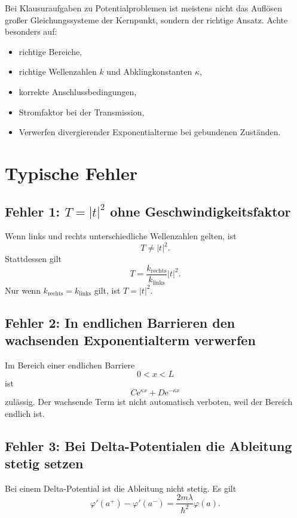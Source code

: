 \begin{examtipbox}
Bei Klausuraufgaben zu Potentialproblemen ist meistens nicht das Auflösen großer Gleichungssysteme der Kernpunkt, sondern der richtige Ansatz. Achte besonders auf:
\begin{itemize}
    \item richtige Bereiche,
    \item richtige Wellenzahlen $k$ und Abklingkonstanten $\kappa$,
    \item korrekte Anschlussbedingungen,
    \item Stromfaktor bei der Transmission,
    \item Verwerfen divergierender Exponentialterme bei gebundenen Zuständen.
\end{itemize}
\end{examtipbox}

\section{Typische Fehler}

\subsection{Fehler 1: $T=|t|^2$ ohne Geschwindigkeitsfaktor}

Wenn links und rechts unterschiedliche Wellenzahlen gelten, ist
\[
    T\ne |t|^2.
\]
Stattdessen gilt
\[
    T=\frac{k_{\mathrm{rechts}}}{k_{\mathrm{links}}}|t|^2.
\]
Nur wenn $k_{\mathrm{rechts}}=k_{\mathrm{links}}$ gilt, ist $T=|t|^2$.

\subsection{Fehler 2: In endlichen Barrieren den wachsenden Exponentialterm verwerfen}

Im Bereich einer endlichen Barriere
\[
    0<x<L
\]
ist
\[
    C\mathrm{e}^{\kappa x}+D\mathrm{e}^{-\kappa x}
\]
zulässig. Der wachsende Term ist nicht automatisch verboten, weil der Bereich endlich ist.

\subsection{Fehler 3: Bei Delta-Potentialen die Ableitung stetig setzen}

Bei einem Delta-Potential ist die Ableitung nicht stetig. Es gilt
\[
    \varphi'(a^+)-\varphi'(a^-)=\frac{2m\lambda}{\hbar^2}\varphi(a).
\]

